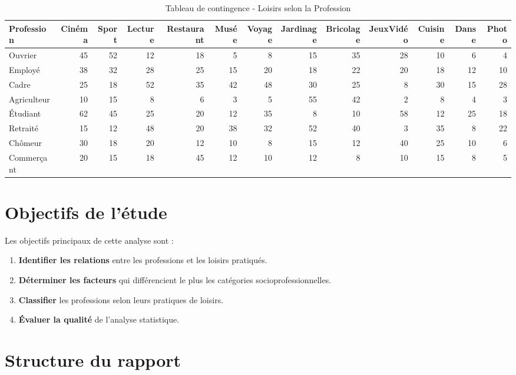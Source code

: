 \documentclass[12pt,a4paper]{book}
\begin{document}
	\begin{table}[H]
		\centering
		\caption{Tableau de contingence - Loisirs selon la Profession}
		\small
		\begin{tabular}{lrrrrrrrrrrrr}
			\toprule
			\textbf{Profession} & \textbf{Cinéma} & \textbf{Sport} & \textbf{Lecture} & \textbf{Restaurant} & \textbf{Musée} & \textbf{Voyage} & \textbf{Jardinage} & \textbf{Bricolage} & \textbf{JeuxVidéo} & \textbf{Cuisine} & \textbf{Danse} & \textbf{Photo} \\
			\midrule
			Ouvrier & 45 & 52 & 12 & 18 & 5 & 8 & 15 & 35 & 28 & 10 & 6 & 4 \\
			Employé & 38 & 32 & 28 & 25 & 15 & 20 & 18 & 22 & 20 & 18 & 12 & 10 \\
			Cadre & 25 & 18 & 52 & 35 & 42 & 48 & 30 & 25 & 8 & 30 & 15 & 28 \\
			Agriculteur & 10 & 15 & 8 & 6 & 3 & 5 & 55 & 42 & 2 & 8 & 4 & 3 \\
			Étudiant & 62 & 45 & 25 & 20 & 12 & 35 & 8 & 10 & 58 & 12 & 25 & 18 \\
			Retraité & 15 & 12 & 48 & 20 & 38 & 32 & 52 & 40 & 3 & 35 & 8 & 22 \\
			Chômeur & 30 & 18 & 20 & 12 & 10 & 8 & 15 & 12 & 40 & 25 & 10 & 6 \\
			Commerçant & 20 & 15 & 18 & 45 & 12 & 10 & 12 & 8 & 10 & 15 & 8 & 5 \\
			\bottomrule
		\end{tabular}
	\end{table}
	
	\section{Objectifs de l'étude}
	
	Les objectifs principaux de cette analyse sont :
	
	\begin{enumerate}
		\item \textbf{Identifier les relations} entre les professions et les loisirs pratiqués.
		\item \textbf{Déterminer les facteurs} qui différencient le plus les catégories socioprofessionnelles.
		\item \textbf{Classifier} les professions selon leurs pratiques de loisirs.
		\item \textbf{Évaluer la qualité} de l'analyse statistique.
	\end{enumerate}
	
	\section{Structure du rapport}
	
\end{document}
